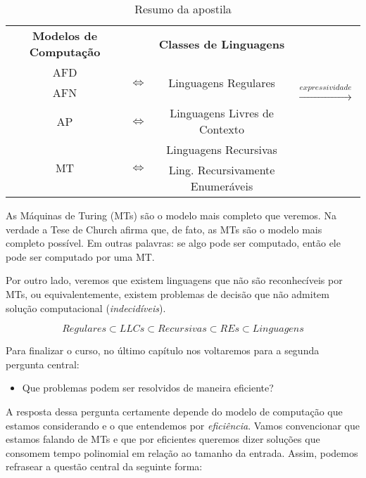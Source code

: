\begin{table}[htbp]
  \centering
  \begin{tabular}{|ccc|c|}
    \hline
    {\bf Modelos de Computação} && {\bf Classes de Linguagens} & \multirow{5}{*}{\begin{turn}{-90}$\xrightarrow{expressividade}$\end{turn}}\\
    \cline{1-3}
    AFD & \multirow{2}{*}{$\Leftrightarrow$} & \multirow{2}{*}{Linguagens Regulares}& \\
    AFN  &&&\\
    \cline{1-3}
    AP & $\Leftrightarrow$ & Linguagens Livres de Contexto &\\
    \cline{1-3}
    \multirow{2}{*}{MT} & \multirow{2}{*}{$\Leftrightarrow$} & Linguagens Recursivas &\\
    & & Ling. Recursivamente Enumeráveis &\\
    \hline
  \end{tabular}
  \caption{Resumo da apostila}
  \label{tab:resumo}
\end{table}


As Máquinas de Turing (MTs) são o modelo mais completo que veremos.
Na verdade a Tese de Church afirma que, de fato, as MTs são o modelo mais completo possível.
Em outras palavras: se algo pode ser computado, então ele pode ser computado por uma MT.

Por outro lado, veremos que existem linguagens que não são reconhecíveis por MTs, ou equivalentemente, existem problemas de decisão que não admitem solução computacional ({\em indecidíveis}).

\begin{displaymath}
  Regulares \subset LLCs \subset Recursivas \subset REs \subset Linguagens
\end{displaymath}


Para finalizar o curso, no último capítulo nos voltaremos para a segunda pergunta central:
\begin{itemize}
\item Que problemas podem ser resolvidos de maneira eficiente?
\end{itemize}

A resposta dessa pergunta certamente depende do modelo de computação que estamos considerando e o que entendemos por {\em eficiência}.
Vamos convencionar que estamos falando de MTs e que por eficientes queremos dizer soluções que consomem tempo polinomial em relação ao tamanho da entrada.
Assim, podemos refrasear a questão central da seguinte forma:

